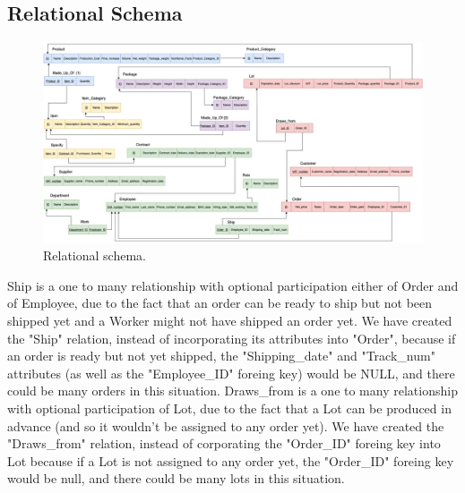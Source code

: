 
\subsection{Relational Schema}
\begin{figure}[!h]
	\centering
	\includegraphics[width=1.3\linewidth,angle=270,origin=c]{Relational.png}
	\caption{Relational schema.}
	\label{fig:relational-schema}
\end{figure}
Ship is a one to many relationship with optional participation either of Order and of Employee, due to the fact that an order can be ready to ship but not been shipped yet and a Worker might not have shipped an order yet. We have created the "Ship" relation, instead of incorporating its attributes into "Order", because if an order is ready but not yet shipped, the "Shipping\_date" and "Track\_num" attributes (as well as the "Employee\_ID" foreing key) would be NULL, and there could be many orders in this situation.
Draws\_from is a one to many relationship with optional participation of Lot, due to the fact that a Lot can be produced in advance (and so it wouldn't be assigned to any order yet). We have created the "Draws\_from" relation, instead of corporating the "Order\_ID" foreing key into Lot because if a Lot is not assigned to any order yet, the "Order\_ID" foreing key would be null, and there could be many lots in this situation.